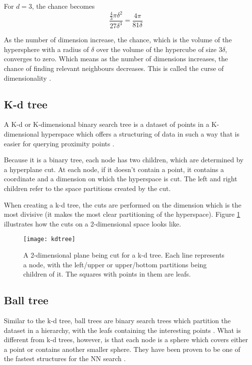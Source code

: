For $d=3$, the chance becomes
\[ \frac{\frac{4}{3} \pi \delta^2}{27 \delta^3} = \frac{4 \pi}{81 \delta} \]

As the number of dimension increase, the chance, which is the volume of the hypersphere with a radius of $\delta$ over the volume of the hypercube of size $3\delta$, converges to zero. Which means as the number of dimensions increases, the chance of finding relevant neighbours decreases. This is called the curse of dimensionality \cite{curse}.

\subsection{K-d tree}
\label{subsec:cluster_knn_kdtree}

A K-d or K-dimensional binary search tree is a dataset of points in a K-dimensional hyperspace which offers a structuring of data in such a way that is easier for querying proximity points \cite{kdtree}. 

Because it is a binary tree, each node has two children, which are determined by a hyperplane cut. At each node, if it doesn't contain a point, it contains a coordinate and a dimension on which the hyperspace is cut. The left and right children refer to the space partitions created by the cut.

When creating a k-d tree, the cuts are performed on the dimension which is the most divisive (it makes the most clear partitioning of the hyperspace). Figure \ref{fig:kdtree} illustrates how the cuts on a 2-dimensional space looks like.

\begin{figure}[b!]
\centering
\texttt{[image: kdtree]}
\caption{A 2-dimensional plane being cut for a k-d tree. Each line represents a node, with the left/upper or upper/bottom partitions being children of it. The squares with points in them are leafs.}
\label{fig:kdtree}
\end{figure}

\subsection{Ball tree}
\label{subsec:cluster_knn_balltree}

Similar to the k-d tree, ball trees are binary search trees which partition the dataset in a hierarchy, with the leafs containing the interesting points \cite{balltree}. What is different from k-d trees, however, is that each node is a sphere which covers either a point or contains another smaller sphere. They have been proven to be one of the fastest structures for the NN search \cite{balltree}.

